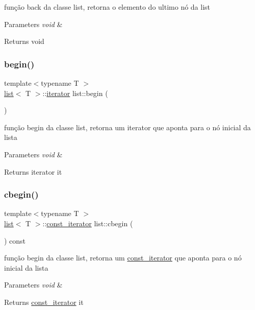 função back da classe list, retorna o elemento do ultimo nó da list 
\begin{DoxyParams}{Parameters}
{\em void} & \\
\hline
\end{DoxyParams}
\begin{DoxyReturn}{Returns}
void 
\end{DoxyReturn}
\mbox{\label{classsc_1_1list_a5f5e6470de04a47d530dae0c87403caa}} 
\subsubsection{\texorpdfstring{begin()}{begin()}}
{\footnotesize\ttfamily template$<$typename T $>$ \\
\mbox{\hyperlink{classsc_1_1list}{list}}$<$ T $>$\+::\mbox{\hyperlink{classsc_1_1list_1_1iterator}{iterator}} list\+::begin (\begin{DoxyParamCaption}{ }\end{DoxyParamCaption})}

função begin da classe list, retorna um iterator que aponta para o nó inicial da lista 
\begin{DoxyParams}{Parameters}
{\em void} & \\
\hline
\end{DoxyParams}
\begin{DoxyReturn}{Returns}
iterator it 
\end{DoxyReturn}
\mbox{\label{classsc_1_1list_aff238d93b985d8e0c340519c58e378cf}} 
\subsubsection{\texorpdfstring{cbegin()}{cbegin()}}
{\footnotesize\ttfamily template$<$typename T $>$ \\
\mbox{\hyperlink{classsc_1_1list}{list}}$<$ T $>$\+::\mbox{\hyperlink{classsc_1_1list_1_1const__iterator}{const\+\_\+iterator}} list\+::cbegin (\begin{DoxyParamCaption}{ }\end{DoxyParamCaption}) const}

função begin da classe list, retorna um \mbox{\hyperlink{classsc_1_1list_1_1const__iterator}{const\+\_\+iterator}} que aponta para o nó inicial da lista 
\begin{DoxyParams}{Parameters}
{\em void} & \\
\hline
\end{DoxyParams}
\begin{DoxyReturn}{Returns}
\mbox{\hyperlink{classsc_1_1list_1_1const__iterator}{const\+\_\+iterator}} it 
\end{DoxyReturn}
\mbox{\label{classsc_1_1list_a935b1947e028c0f733bbe14afd0fd38f}} 
